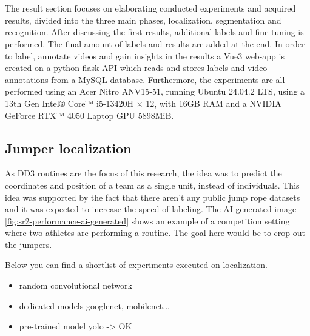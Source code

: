 
\chapter{}%
\label{ch:results}

The result section focuses on elaborating conducted experiments and acquired results, divided into the three main phases, localization, segmentation and recognition. After discussing the first results, additional labels and fine-tuning is performed. The final amount of labels and results are added at the end. In order to label, annotate videos and gain insights in the results a Vue3 web-app is created on a python flask API which reads and stores labels and video annotations from a MySQL database. Furthermore, the experiments are all performed using an Acer Nitro ANV15-51, running Ubuntu 24.04.2 LTS, using a 13th Gen Intel® Core™ i5-13420H × 12, with 16GB RAM and a NVIDIA GeForce RTX™ 4050 Laptop GPU 5898MiB.

\section{Jumper localization}

As DD3 routines are the focus of this research, the idea was to predict the coordinates and position of a team as a single unit, instead of individuals. This idea was supported by the fact that there aren't any public jump rope datasets and it was expected to increase the speed of labeling. The AI generated image \ref{fig:sr2-performance-ai-generated} shows an example of a competition setting where two athletes are performing a routine. The goal here would be to crop out the jumpers.


Below you can find a shortlist of experiments executed on localization.

\begin{itemize}
    \item random convolutional network
    \item dedicated models googlenet, mobilenet...
    \item pre-trained model yolo -> OK
\end{itemize}

